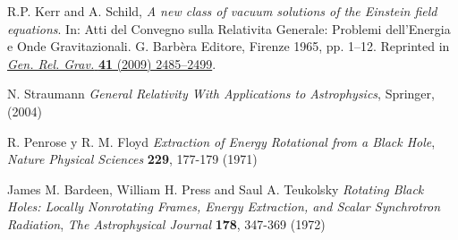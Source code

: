 \begin{thebibliography}{99}
 R.P. Kerr and A. Schild, {\em A new class of vacuum solutions of the Einstein field equations}. In: Atti del Convegno sulla Relativita Generale: Problemi dell’Energia e Onde Gravitazionali. G. Barbèra Editore, Firenze 1965, pp. 1–12. Reprinted in \href{http://dx.doi.org/10.1007/s10714-009-0856-0}{{\sl Gen. Rel. Grav.} {\bf 41} (2009) 2485--2499}. 

 N. Straumann {\em General Relativity With Applications to Astrophysics}, Springer, (2004)

 R. Penrose y R. M. Floyd {\em Extraction of Energy Rotational from a Black Hole}, {\sl Nature Physical Sciences} {\bf 229}, 177-179 (1971)

 James M. Bardeen, William H. Press and Saul A. Teukolsky {\em Rotating Black Holes: Locally Nonrotating Frames, Energy Extraction, and Scalar Synchrotron Radiation}, {\sl The Astrophysical Journal} {\bf 178}, 347-369 (1972)
\end{thebibliography}
